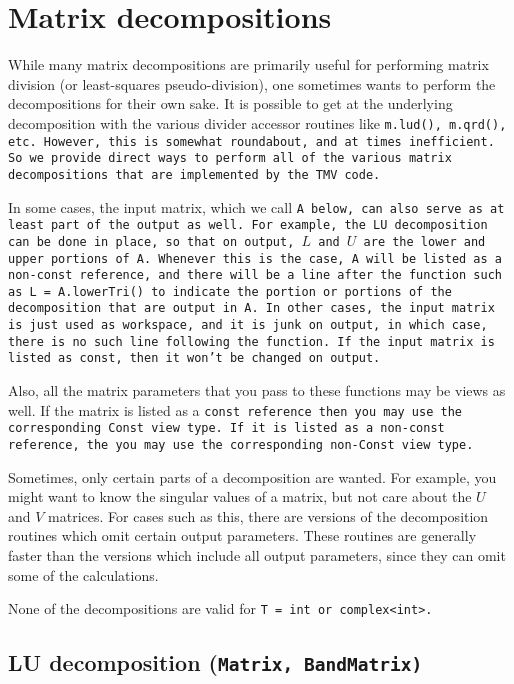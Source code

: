 
\section{Matrix decompositions}
\label{Decompositions}

While many matrix decompositions are primarily useful for performing matrix division
(or least-squares pseudo-division), one sometimes wants to perform the decompositions for 
their own sake.  It is possible to get at the underlying decomposition with the various
divider accessor routines like \tt{m.lud()}, \tt{m.qrd()}, etc.  However, this is somewhat
roundabout, and at times inefficient.  So we provide direct ways to perform all of
the various matrix decompositions that are implemented by the TMV code.

In some cases, the input matrix, which we call \tt{A} below, can also serve as at least part of the output as well.  For example, the LU decomposition can be done in place, so that on output, $L$ and $U$ are the lower and upper portions of \tt{A}.  Whenever this is the case, \tt{A} will be listed as a non-\tt{const} reference, and there will be a line after the function such as \tt{L = A.lowerTri()} to indicate the portion or portions of the decomposition that are output in \tt{A}.
In other cases, the input matrix is just used as workspace, and it is junk
on output, in which case, there is no such line following the function.
If the input matrix is listed as \tt{const}, then it won't be changed on output.

Also, all the matrix parameters that you pass to these functions may be views as well.  If the matrix is listed as a \tt{const} reference then you may use the corresponding \tt{Const} view type.  If it is listed as a non-\tt{const} reference, the you may use the corresponding non-\tt{Const} view type.

Sometimes, only certain parts of a decomposition are wanted.  For example,
you might want to know the singular values of a matrix, but not care about
the $U$ and $V$ matrices.  For cases such as this, there are versions
of the decomposition routines which omit certain output parameters.
These routines are generally faster than the versions which include all
output parameters, since they can omit some of the calculations.

None of the decompositions are valid for \tt{T = int} or \tt{complex<int>}.

\subsection[LU decomposition] {LU decomposition \rm (\tt{Matrix}, \tt{BandMatrix})}

